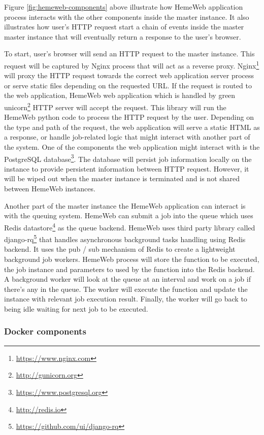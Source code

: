 \vspace{1cm}

Figure \ref{fig:hemeweb-components} above illustrate how HemeWeb  application process interacts with the other components inside the master instance. It also illustrates how user's HTTP request start a chain of events inside the master master instance that will eventually return a response to the user's browser.

To start, user's browser will send an HTTP request to the master instance. This request will be captured by Nginx process that will act as a reverse proxy.  Nginx\footnote{\url{https://www.nginx.com}} will proxy the HTTP request towards the correct web application server process or serve static files depending on the requested URL. If the request is routed to the web application, HemeWeb web application which is handled by green unicorn\footnote{\url{http://gunicorn.org}} HTTP server will accept the request. This library will run the HemeWeb python code to process the HTTP request by the user. Depending on the type and path of the request, the web application will serve a static HTML as a response, or handle job-related logic that might interact with another part of the system. One of the components the web application might interact with is the PostgreSQL database\footnote{\url{https://www.postgresql.org}}. The database will persist job information locally on the instance to provide persistent information between HTTP request. However, it will be wiped out when the master instance is terminated and is not shared between HemeWeb instances.

Another part of the master instance the HemeWeb application can interact is with the queuing system. HemeWeb can submit a job into the queue which uses Redis datastore\footnote{\url{http://redis.io}} as the queue backend. HemeWeb uses third party library called django-rq\footnote{\url{https://github.com/ui/django-rq}} that handles asynchronous background tasks handling using Redis backend. It uses the pub / sub mechanism of Redis to create a lightweight background job workers. HemeWeb process will store the function to be executed, the job instance and parameters to used by the function into the Redis backend. A background worker will look at the queue at an interval and work on a job if there's any in the queue. The worker will execute the function and update the instance with relevant job execution result. Finally, the worker will go back to being idle waiting for next job to be executed.

\subsubsection{Docker components}

